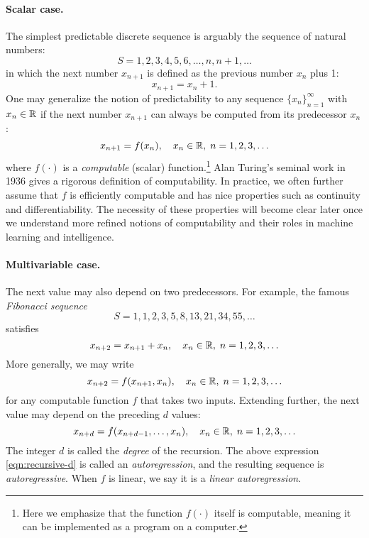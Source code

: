 \documentclass[../../book-main.tex]{subfiles}
\begin{document}
\paragraph{Scalar case.} The simplest predictable discrete sequence is arguably the sequence of natural numbers:
\begin{equation}
   S = 1, 2, 3, 4, 5, 6, \ldots, n, n+1, \ldots
\end{equation}
in which the next number \(x_{n+1}\) is defined as the previous number \(x_{n}\) plus 1:
\begin{equation}
    x_{n+1} = x_{n} + 1.    
\end{equation}
One may generalize the notion of predictability to any sequence \(\{x_{n}\}_{n=1}^{\infty}\) with \(x_{n} \in \mathbb{R}\) if the next number \(x_{n+1}\) can always be computed from its predecessor \(x_{n}\):
\begin{equation}
    x_{n+1} = f(x_{n}), \quad x_{n} \in \mathbb{R}, \; n = 1, 2, 3, \ldots
\end{equation}
where \(f(\cdot)\) is a \textit{computable} (scalar) function.\footnote{Here we emphasize that the function \(f(\cdot)\) itself is computable, meaning it can be implemented as a program on a computer.} Alan Turing's seminal work in 1936 \cite{Turing-1936} gives a rigorous definition of computability. In practice, we often further assume that \(f\) is efficiently computable and has nice properties such as continuity and differentiability. The necessity of these properties will become clear later once we understand more refined notions of computability and their roles in machine learning and intelligence.

\paragraph{Multivariable case.}
The next value may also depend on two predecessors. For example, the famous \textit{Fibonacci sequence}
\begin{equation}
    S = 1, 1, 2, 3, 5, 8, 13, 21, 34, 55, \ldots
\end{equation}
satisfies
\begin{equation}
    x_{n+2} = x_{n+1} + x_{n}, \quad x_{n} \in \mathbb{R}, \; n = 1, 2, 3, \ldots
\end{equation}
More generally, we may write
\begin{equation}
    x_{n+2} = f(x_{n+1}, x_{n}), \quad x_{n} \in \mathbb{R}, \; n = 1, 2, 3, \ldots
\end{equation}
for any computable function \(f\) that takes two inputs. Extending further, the next value may depend on the preceding \(d\) values:
\begin{equation}
    x_{n+d} = f(x_{n+d-1}, \ldots, x_{n}), \quad x_{n} \in \mathbb{R}, \; n = 1, 2, 3, \ldots
    \label{eqn:recursive-d}
\end{equation}
The integer \(d\) is called the \textit{degree} of the recursion. The above expression \eqref{eqn:recursive-d} is called an \textit{autoregression}, and the resulting sequence is \textit{autoregressive}. When \(f\) is linear, we say it is a \textit{linear autoregression}.
\end{document}
